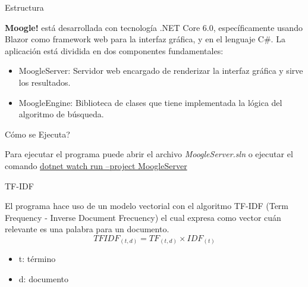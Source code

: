 \documentclass{beamer}
\begin{document}
\begin{frame}{Estructura}
    \begin{center}
        \textbf{Moogle!} está desarrollada con tecnología .NET Core 6.0, específicamente usando Blazor como framework web para la interfaz gráfica, y en el lenguaje C\#. La aplicación está dividida en dos componentes fundamentales:
    \end{center}
        \begin{itemize}
            \item MoogleServer: Servidor web encargado de renderizar la interfaz gráfica y sirve los resultados.
            \item MoogleEngine: Biblioteca de clases que tiene implementada la lógica del algoritmo de búsqueda.
        \end{itemize}
\end{frame}

\begin{frame}{Cómo se Ejecuta?}
    \begin{center}
        \large Para ejecutar el programa puede abrir el archivo \emph{MoogleServer.sln} o ejecutar el comando \underline{dotnet watch run --project MoogleServer}
    \end{center}
\end{frame}

\begin{frame}{TF-IDF}
    \begin{center}
        \large El programa hace uso de un modelo vectorial con el algoritmo TF-IDF (Term Frequency - Inverse Document Frecuency) el cual
        expresa como vector cuán relevante es una palabra para un documento.
        \begin{equation}
            TFIDF_{(t,d)} = TF_{(t,d)} \times IDF_{(t)}
        \end{equation}
        \begin{itemize}
            \item t: término
            \item d: documento
        \end{itemize}
        
    \end{center}
\end{frame}
\end{document}
